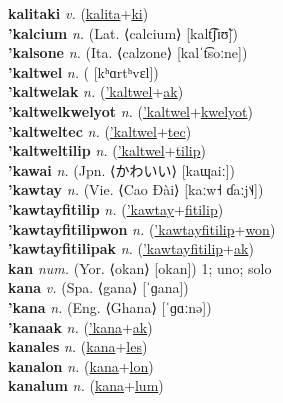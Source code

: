 \textbf{kalitaki} \textit{v.} (\hyperref[kalita]{kalita}+\hyperref[ki]{ki})
 \label{kalitaki} \\
\textbf{'kalcium} \textit{n.} (Lat. ⟨calcium⟩ [kalt͡ʃɪʊ̃])
 \label{'kalcium} \\
\textbf{'kalsone} \textit{n.} (Ita. ⟨calzone⟩ [kalˈt͡soːne])
 \label{'kalsone} \\
\textbf{'kaltwel} \textit{n.} ( [kʰɑrtʰvɛl])
 \label{'kaltwel} \\
\textbf{'kaltwelak} \textit{n.} (\hyperref['kaltwel]{'kaltwel}+\hyperref[ak]{ak})
 \label{'kaltwelak} \\
\textbf{'kaltwelkwelyot} \textit{n.} (\hyperref['kaltwel]{'kaltwel}+\hyperref[kwelyot]{kwelyot})
 \label{'kaltwelkwelyot} \\
\textbf{'kaltweltec} \textit{n.} (\hyperref['kaltwel]{'kaltwel}+\hyperref[tec]{tec})
 \label{'kaltweltec} \\
\textbf{'kaltweltilip} \textit{n.} (\hyperref['kaltwel]{'kaltwel}+\hyperref[tilip]{tilip})
 \label{'kaltweltilip} \\
\textbf{'kawai} \textit{n.} (Jpn. ⟨かわいい⟩ [kaɰaiː])
 \label{'kawai} \\
\textbf{'kawtay} \textit{n.} (Vie. ⟨Cao Đài⟩ [kaːw˧ ɗaːj˦˨])
 \label{'kawtay} \\
\textbf{'kawtayfitilip} \textit{n.} (\hyperref['kawtay]{'kawtay}+\hyperref[fitilip]{fitilip})
 \label{'kawtayfitilip} \\
\textbf{'kawtayfitilipwon} \textit{n.} (\hyperref['kawtayfitilip]{'kawtayfitilip}+\hyperref[won]{won})
 \label{'kawtayfitilipwon} \\
\textbf{'kawtayfitilipak} \textit{n.} (\hyperref['kawtayfitilip]{'kawtayfitilip}+\hyperref[ak]{ak})
 \label{'kawtayfitilipak} \\
\textbf{kan} \textit{num.} (Yor. ⟨okan⟩ [okan])
1; uno; solo \label{kan} \\
\textbf{kana} \textit{v.} (Spa. ⟨gana⟩ [ˈɡana])
 \label{kana} \\
\textbf{'kana} \textit{n.} (Eng. ⟨Ghana⟩ [ˈɡɑːnə])
 \label{'kana} \\
\textbf{'kanaak} \textit{n.} (\hyperref['kana]{'kana}+\hyperref[ak]{ak})
 \label{'kanaak} \\
\textbf{kanales} \textit{n.} (\hyperref[kana]{kana}+\hyperref[les]{les})
 \label{kanales} \\
\textbf{kanalon} \textit{n.} (\hyperref[kana]{kana}+\hyperref[lon]{lon})
 \label{kanalon} \\
\textbf{kanalum} \textit{n.} (\hyperref[kana]{kana}+\hyperref[lum]{lum})
